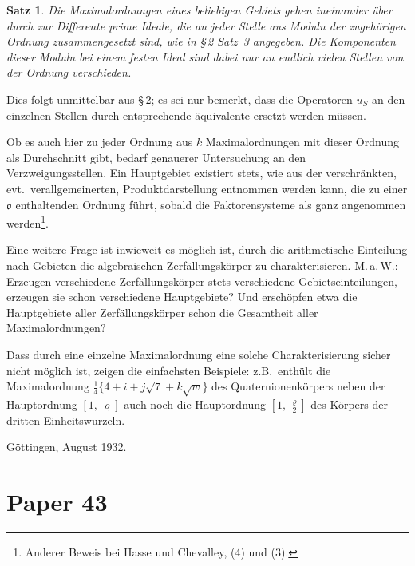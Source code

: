 \documentclass[10pt,a4paper]{article}
\theoremstyle{plain}
\newtheorem{satz}{Satz}[section]
\theoremstyle{definition}
\theoremstyle{remark}
\newcommand{\ido}{\mathfrak{o}}
\begin{document}
\begin{satz}
Die Maximalordnungen eines beliebigen Gebiets gehen ineinander \"uber durch zur Differente prime Ideale, die an jeder Stelle aus Moduln der zugeh\"origen Ordnung zusammengesetzt sind, wie in \S\,2 Satz~3 angegeben. Die Komponenten dieser Moduln bei einem festen Ideal sind dabei nur an endlich vielen Stellen von der Ordnung verschieden.
\end{satz}

Dies folgt unmittelbar aus \S\,2; es sei nur bemerkt, dass die Operatoren $u_S$ an den einzelnen Stellen durch entsprechende \"aquivalente ersetzt werden m{\"u}ssen.

Ob es auch hier zu jeder Ordnung aus $k$ Maximalordnungen mit dieser Ordnung als Durchschnitt gibt, bedarf genauerer Untersuchung an den Verzweigungsstellen. Ein Hauptgebiet existiert stets, wie aus der verschr\"ankten, evt.\ verallgemeinerten, Produktdarstellung entnommen werden kann, die zu einer $\ido$ enthaltenden Ordnung f\"uhrt, sobald die Faktorensysteme als ganz angenommen werden\footnote{Anderer Beweis bei Hasse und Chevalley, (4) und (3).}.

Eine weitere Frage ist inwieweit es m\"oglich ist, durch die arithmetische Einteilung nach Gebieten die algebraischen Zerf\"allungsk\"orper zu charakterisieren. M.\,a.\,W.: Erzeugen verschiedene Zerf\"allungsk\"orper stets verschiedene Gebietseinteilungen, erzeugen sie schon verschiedene Hauptgebiete? Und ersch\"opfen etwa die Hauptgebiete aller Zerf\"allungsk\"orper schon die Gesamtheit aller Maximalordnungen?

Dass durch eine einzelne Maximalordnung eine solche Charakterisierung sicher nicht m\"oglich ist, zeigen die einfachsten Beispiele: z.B.~enth\"ult die Maximalordnung $\frac{1}{4}\{4+i+j\sqrt{7}+k\sqrt{w}\}$ des Quaternionenk\"orpers neben der Hauptordnung $[1,\,\varrho]$ auch noch die Hauptordnung $[1,\,\frac{\varrho}{2}]$ des K\"orpers der dritten Einheitswurzeln.

\begin{flushright} G\"ottingen, August 1932. \end{flushright}

\newpage
\section*{Paper 43}
\end{document}
